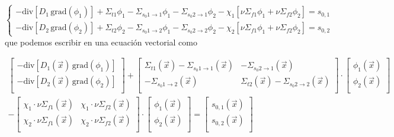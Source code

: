 \documentclass[
  12pt,
  a4paper,
  table]{scrbook}
\theoremstyle{plain}
\theoremstyle{definition}
\theoremstyle{plain}
\theoremstyle{plain}
\theoremstyle{remark}
\begin{document}
\[
\begin{cases}
 - \text{div} \left[ D_1 \, \text{grad} \left( \phi_1 \right) \right]
 + \Sigma_{t1} \phi_1 - \Sigma_{s_0 1 \rightarrow 1} \phi_1 - \Sigma_{s_0 2 \rightarrow 1} \phi_2 - \chi_1 \left[ \nu\Sigma_{f1} \phi_1 + \nu\Sigma_{f2} \phi_2 \right] = s_{0,1} \\
 - \text{div} \left[ D_2 \, \text{grad} \left( \phi_2 \right) \right]
 + \Sigma_{t2} \phi_2 - \Sigma_{s_0 1 \rightarrow 2} \phi_1 - \Sigma_{s_0 2 \rightarrow 2} \phi_2 - \chi_2 \left[ \nu\Sigma_{f1} \phi_1 + \nu\Sigma_{f2} \phi_2 \right] = s_{0,2}
\end{cases}
\] que podemos escribir en una ecuación vectorial como

\[
\begin{gathered}
\begin{bmatrix}
 - \text{div} \left[ D_1(\vec{x}) \, \text{grad} \left( \phi_1 \right) \right] \\
 - \text{div} \left[ D_2(\vec{x}) \, \text{grad} \left( \phi_2 \right) \right] \\
\end{bmatrix}
+
\begin{bmatrix}
 \Sigma_{t1}(\vec{x}) - \Sigma_{s_0 1 \rightarrow 1}(\vec{x}) & - \Sigma_{s_0 2 \rightarrow 1}(\vec{x}) \\
 - \Sigma_{s_0 1 \rightarrow 2}(\vec{x}) & \Sigma_{t2}(\vec{x}) - \Sigma_{s_0 2 \rightarrow 2}(\vec{x}) \\
\end{bmatrix}
\cdot
\begin{bmatrix}
 \phi_1(\vec{x}) \\
 \phi_2(\vec{x}) \\
\end{bmatrix}
\\
-
\begin{bmatrix}
 \chi_1 \cdot \nu\Sigma_{f1}(\vec{x}) & \chi_1 \cdot \nu\Sigma_{f2}(\vec{x}) \\
 \chi_2 \cdot \nu\Sigma_{f1}(\vec{x}) & \chi_2 \cdot \nu\Sigma_{f2}(\vec{x}) \\
\end{bmatrix}
\cdot
\begin{bmatrix}
 \phi_1(\vec{x}) \\
 \phi_2(\vec{x}) \\
\end{bmatrix}
=
\begin{bmatrix}
 s_{0,1}(\vec{x}) \\
 s_{0,2}(\vec{x}) \\
\end{bmatrix}
\end{gathered}
\]
\end{document}
